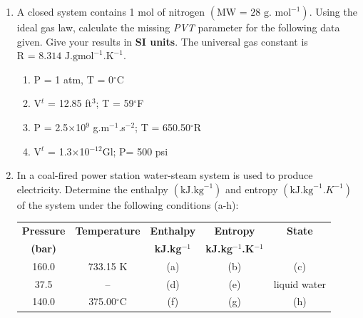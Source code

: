 \documentclass[12pts,a4paper,amsmath,amssymb,floatfix]{article}%
\begin{document}
\begin{enumerate}[label=\bfseries Problem \arabic*:]

\item\label{Tut01:UnitConversion} A closed system contains 1 mol of nitrogen $\left(\text{MW = 28 g. mol}^{-1}\right)$. Using the ideal gas law, calculate the missing {\it PVT} parameter for the following data given. Give your results in {\bf SI units}. The universal gas constant is $\text{R = 8.314 J.gmol}^{-1}\text{.K}^{-1}$.
\begin{enumerate}   
\item P = 1 atm, T = 0$^{\circ}$C
\item V$^{t}$ = 12.85 ft$^{3}$; T = 59$^{\circ}$F
\item P = 2.5$\times$10$^{9}$ g.m$^{-1}$.s$^{-2}$; T = 650.50$^{\circ}$R
\item V$^{t}$ = 1.3$\times$10$^{-12}$Gl; P= 500 psi
\end{enumerate}


\item\label{Tut01:LinearInterpolation} In a coal-fired power station water-steam system is used to produce electricity. Determine the enthalpy $\left(\text{kJ.kg}^{-1}\right)$ and entropy $\left(\text{kJ.kg}^{-1}.K^{-1}\right)$ of the system under the following conditions (a-h):
\begin{center}
\begin{tabular}{||c | c |  c  c | c ||}
\hline\hline
{\bf Pressure}  & {\bf Temperature}  & {\bf Enthalpy}      & {\bf Entropy}               &   {\bf State} \\
{\bf (bar)}     &                    & {\bf kJ.kg$^{-1}$}   & {\bf kJ.kg$^{-1}$.K$^{-1}$}  &               \\
\hline
 160.0          &    733.15 K        &     (a)             &     (b)                     &   (c)         \\
  37.5          &     --             &     (d)             &     (e)                     &   liquid water \\
 140.0          &    375.00$^{\circ}$C&     (f)             &     (g)                     &   (h)         \\  
\hline\hline
\end{tabular}
\end{center} 



\end{enumerate}
\end{document}
